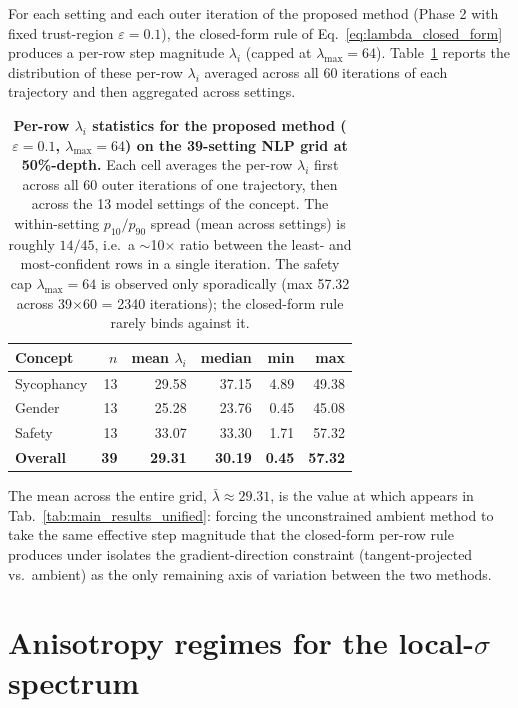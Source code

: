 For each setting and each outer iteration of the proposed method (Phase 2 with fixed trust-region $\varepsilon = 0.1$), the closed-form rule of Eq.~\ref{eq:lambda_closed_form} produces a per-row step magnitude $\lambda_i$ (capped at $\lambda_{\max} = 64$). Table~\ref{tab:lambda_stats} reports the distribution of these per-row $\lambda_i$ averaged across all 60 iterations of each trajectory and then aggregated across settings.

\begin{table}[t]
\centering
\small
\caption{\textbf{Per-row $\lambda_i$ statistics for the proposed method ($\varepsilon = 0.1$, $\lambda_{\max}=64$) on the 39-setting NLP grid at 50\%-depth.} Each cell averages the per-row $\lambda_i$ first across all 60 outer iterations of one trajectory, then across the 13 model settings of the concept. The within-setting $p_{10}/p_{90}$ spread (mean across settings) is roughly $14/45$, i.e.\ a $\sim$10$\times$ ratio between the least- and most-confident rows in a single iteration. The safety cap $\lambda_{\max}=64$ is observed only sporadically (max 57.32 across 39$\times$60 = 2340 iterations); the closed-form rule rarely binds against it.}
\label{tab:lambda_stats}
\begin{tabular}{l r r r r r}
\toprule
Concept & $n$ & mean $\lambda_i$ & median & min & max \\
\midrule
Sycophancy & 13 & 29.58 & 37.15 & 4.89 & 49.38 \\
Gender & 13 & 25.28 & 23.76 & 0.45 & 45.08 \\
Safety & 13 & 33.07 & 33.30 & 1.71 & 57.32 \\
\midrule
\textbf{Overall} & \textbf{39} & \textbf{29.31} & \textbf{30.19} & \textbf{0.45} & \textbf{57.32} \\
\bottomrule
\end{tabular}
\end{table}

The mean across the entire grid, $\bar{\lambda} \approx 29.31$, is the value at which \AmbGCEpp{} appears in Tab.~\ref{tab:main_results_unified}: forcing the unconstrained ambient method to take the same effective step magnitude that the closed-form per-row rule produces under \TanGCEpp{} isolates the gradient-direction constraint (tangent-projected vs.\ ambient) as the only remaining axis of variation between the two methods.

\section{Anisotropy regimes for the local-$\sigma$ spectrum}
\label{sec:appendix_alpha_regimes}

